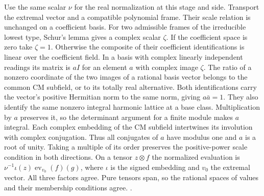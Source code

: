 Use the same scalar \(\nu\) for the real normalization at this
stage and side. Transport the extremal vector and a compatible
polynomial frame. Their scale relation is unchanged on a coefficient
basis. For two admissible frames of the irreducible lowest type,
Schur's lemma gives a complex scalar \(\zeta\). If the coefficient
space is zero take \(\zeta=1\). Otherwise the composite of their
coefficient identifications is linear over the coefficient field.
In a basis with complex linearly independent readings its matrix
is \(aI\) for an element \(a\) with complex image \(\zeta\).
The ratio of a nonzero coordinate of the two images of a rational
basis vector belongs to the common CM subfield, or to its totally
real alternative. Both identifications carry the vector's positive
Hermitian norm to the same norm, giving \(a\bar a=1\). They also
identify the same nonzero integral harmonic lattice at a base class.
Multiplication by \(a\) preserves it, so the determinant argument for
a finite module makes \(a\) integral. Each complex embedding of the
CM subfield intertwines its involution with complex conjugation.
Thus all conjugates of \(a\) have modulus one and \(a\) is a root of
unity. Taking a multiple of its order preserves the positive-power
scale condition in both directions. On a tensor \(z\otimes f\) the
normalized evaluation is
\(\nu^{-1}\iota(z)\operatorname{ev}_{v_0}(f)(g)\), where
\(\iota\) is the signed embedding and \(v_0\) the extremal vector.
All three factors agree. Pure tensors span, so the rational
spaces of values and their membership conditions agree.
.

